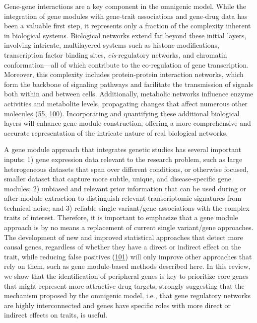 Gene-gene interactions are a key component in the omnigenic model.
While the integration of gene modules with gene-trait associations and gene-drug data has been a valuable first step, it represents only a fraction of the complexity inherent in biological systems.
Biological networks extend far beyond these initial layers, involving intricate, multilayered systems such as histone modifications, transcription factor binding sites, \emph{cis}-regulatory networks, and chromatin conformation---all of which contribute to the co-regulation of gene transcription.
Moreover, this complexity includes protein-protein interaction networks, which form the backbone of signaling pathways and facilitate the transmission of signals both within and between cells.
Additionally, metabolic networks influence enzyme activities and metabolite levels, propagating changes that affect numerous other molecules (\protect\hyperlink{ref-dg9nKuy0}{55}, \protect\hyperlink{ref-KNAOTAKP}{100}).
Incorporating and quantifying these additional biological layers will enhance gene module construction, offering a more comprehensive and accurate representation of the intricate nature of real biological networks.

A gene module approach that integrates genetic studies has several important inputs: 1) gene expression data relevant to the research problem, such as large heterogeneous datasets that span over different conditions, or otherwise focused, smaller dataset that capture more subtle, unique, and disease-specific gene modules; 2) unbiased and relevant prior information that can be used during or after module extraction to distinguish relevant transcriptomic signatures from technical noise; and 3) reliable single variant/gene associations with the complex traits of interest.
Therefore, it is important to emphasize that a gene module approach is by no means a replacement of current single variant/gene approaches.
The development of new and improved statistical approaches that detect more causal genes, regardless of whether they have a direct or indirect effect on the trait, while reducing false positives (\protect\hyperlink{ref-i8Qjy4pw}{101}) will only improve other approaches that rely on them, such as gene module-based methods described here.
In this review, we show that the identification of peripheral genes is key to prioritize core genes that might represent more attractive drug targets, strongly suggesting that the mechanism proposed by the omnigenic model, i.e., that gene regulatory networks are highly interconnected and genes have specific roles with more direct or indirect effects on traits, is useful.

